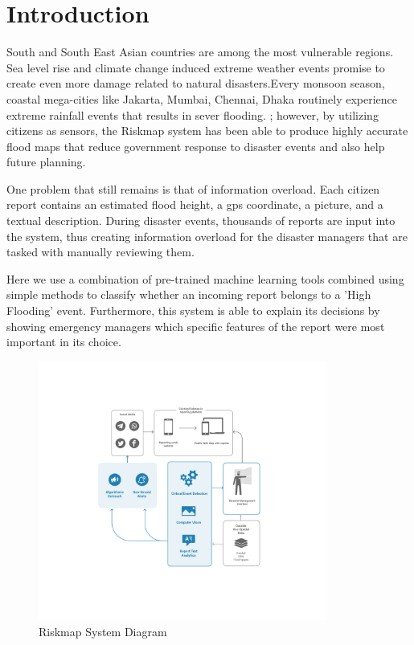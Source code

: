 \section{Introduction}
South and South East Asian countries are among the most vulnerable regions. Sea level rise and climate change induced extreme weather events promise to create even more damage related to natural disasters.Every monsoon season, coastal mega-cities like Jakarta, Mumbai, Chennai, Dhaka routinely experience extreme rainfall events that results in sever flooding.  ; however, 
by utilizing citizens as sensors, the Riskmap system 
has been able to produce highly accurate flood maps that 
reduce government response to disaster events and also help 
future planning. 

One problem that still remains is that of information overload. 
Each citizen report contains an estimated flood height, a gps coordinate, 
a picture, and a textual description. During disaster events, thousands 
of reports are input into the system, thus creating information overload 
for the disaster managers that are tasked with manually reviewing them.

Here we use a combination of pre-trained  machine learning tools 
combined using simple methods to classify whether an incoming report belongs 
to a 'High Flooding' event. Furthermore, this system is able to explain its decisions 
by showing emergency managers which specific features of the report were most important in its choice.

\begin{figure}[ht]
    \includegraphics[width= 95mm]{high_level.png}
    \caption{Riskmap System Diagram}
\end{figure}

